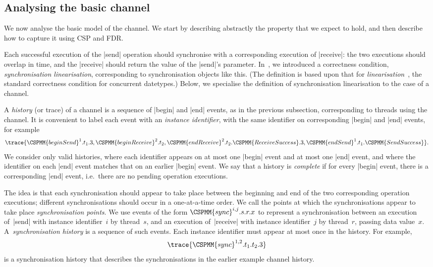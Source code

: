 \inlineCSP

\subsection{Analysing the basic channel}
\label{sec:syncchan-analysis-1}

We now analyse the basic model of the channel.  We start by describing
abstractly the property that we expect to hold, and then describe how to
capture it using CSP and FDR.

Each successful execution of the |send| operation should synchronise with a
corresponding execution of |receive|: the two executions should overlap in
time, and the |receive| should return the value of the |send|'s parameter.
In~\cite{LL:synchronisation}, we introduced a correctness condition,
\emph{synchronisation linearisation}, corresponding to synchronisation objects
like this.  (The definition is based upon that for
\emph{linearisation}~\cite{herlihy-wing}, the standard correctness condition
for concurrent datetypes.)  Below, we specialise the definition of
synchronisation linearisation to the case of a channel.

A \emph{history} (or trace) of a channel is a sequence of |begin| and |end|
events, as in the previous subsection, corresponding to threads using the
channel.  It is convenient to label each event with an \emph{instance
  identifier}, with the same identifier on corresponding |begin| and |end|
events, for example
\[
\trace{\CSPMM{beginSend}^1.t_1.3, \CSPMM{beginReceive}^2.t_2,
  \CSPMM{endReceive}^2.t_2.\CSPMM{ReceiveSuccess}.3, 
  \CSPMM{endSend}^1.t_1.\CSPMM{SendSuccess} }.
\]
We consider only valid histories, where each identifier appears on at most one
|begin| event and at most one |end| event, and where the identifier on each
|end| event matches that on an earlier |begin| event.  We say that a history
is \emph{complete} if for every |begin| event, there is a corresponding |end|
event, i.e.~there are no pending operation executions.

The idea is that each synchronisation should appear to take place between the
beginning and end of the two corresponding operation executions; different
synchronisations should occur in a one-at-a-time order.  We call the points at
which the synchronisations appear to take place \emph{synchronisation points}.
%
We use events of the form $\CSPMM{sync}^{i,j}.s.r.x$ to represent a
synchronisation between an execution of~|send| with instance identifier~$i$ by
thread~$s$, and an execution of~|receive| with instance identifier~$j$ by
thread~$r$, passing data value~$x$.
%
A~\emph{synchronisation history} is a sequence of such  events.
Each instance identifier must appear at most once in the history. 
For example,
\[
\trace{\CSPMM{sync}^{1,2}.t_1.t_2.3}
\]
is a synchronisation history that describes the synchronisations in the
earlier example channel history.  

